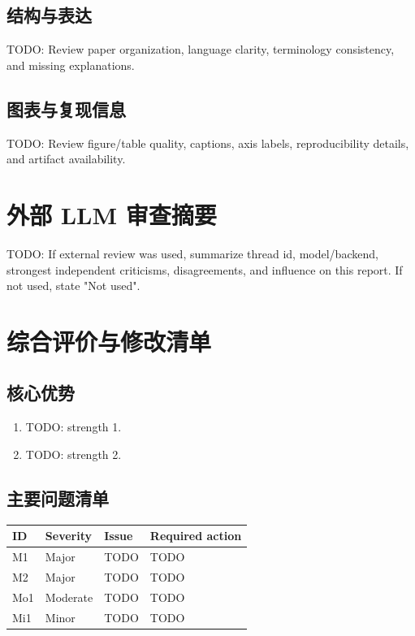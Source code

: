 \documentclass[11pt,a4paper]{article}
\begin{document}
\subsection{结构与表达}
TODO: Review paper organization, language clarity, terminology consistency, and missing explanations.

\subsection{图表与复现信息}
TODO: Review figure/table quality, captions, axis labels, reproducibility details, and artifact availability.

\section{外部 LLM 审查摘要}

TODO: If external review was used, summarize thread id, model/backend, strongest independent criticisms, disagreements, and influence on this report. If not used, state "Not used".

\section{综合评价与修改清单}

\subsection{核心优势}
\begin{positivebox}[Strengths]
\begin{enumerate}
  \item TODO: strength 1.
  \item TODO: strength 2.
\end{enumerate}
\end{positivebox}

\subsection{主要问题清单}
\begin{longtable}{p{}p{}p{}p{}}
\toprule
\textbf{ID} & \textbf{Severity} & \textbf{Issue} & \textbf{Required action} \\
\midrule
M1 & Major & TODO & TODO \\
M2 & Major & TODO & TODO \\
Mo1 & Moderate & TODO & TODO \\
Mi1 & Minor & TODO & TODO \\
\bottomrule
\end{longtable}
\end{document}
